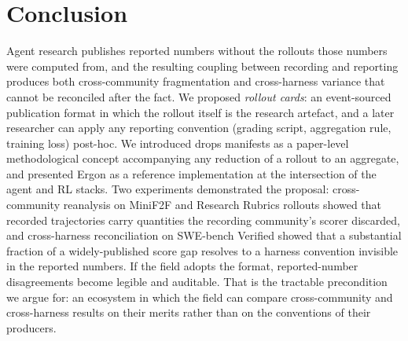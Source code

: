 \documentclass{article}
\begin{document}
\section{Conclusion}
\label{sec:conclusion}

Agent research publishes reported numbers without the rollouts
those numbers were computed from, and the resulting coupling
between recording and reporting produces both cross-community
fragmentation and cross-harness variance that cannot be
reconciled after the fact. We proposed \emph{rollout cards}:
an event-sourced publication format in which the rollout
itself is the research artefact, and a later researcher can
apply any reporting convention (grading script, aggregation
rule, training loss) post-hoc. We introduced drops manifests as a
paper-level methodological concept accompanying any reduction
of a rollout to an aggregate, and presented Ergon as a
reference implementation at the intersection of the agent and
RL stacks. Two experiments demonstrated the proposal:
cross-community reanalysis on MiniF2F and Research Rubrics
rollouts showed that recorded trajectories carry quantities
the recording community's scorer discarded, and
cross-harness reconciliation on SWE-bench Verified showed that
a substantial fraction of a widely-published score gap
resolves to a harness convention invisible in the reported
numbers. If the field adopts the format, reported-number disagreements
become legible and auditable. That is the tractable
precondition we argue for: an ecosystem in which the field can
compare cross-community and cross-harness results on their
merits rather than on the conventions of their producers.




\appendix


\end{document}

